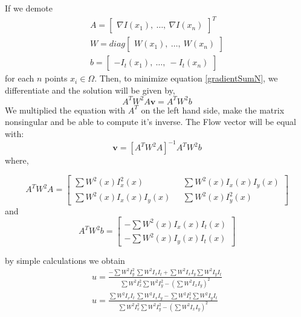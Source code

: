 \documentclass[12pt,a4paper,twoside]{report}
\begin{document}
{If we demote
\begin{equation}
\begin{split}
A = \begin{bmatrix}
\nabla I(x_1), \ \dots , \ \nabla I(x_n)
\end{bmatrix} ^T \\
W = diag
\begin{bmatrix}
W(x_1), \ \dots , \ W(x_n)
\end{bmatrix}
\\
b = 
\begin{bmatrix}
-I_t(x_1), \ \dots, \ -I_t(x_n) 
\end{bmatrix}
\end{split}
\end{equation}
for each $n$ points $x_i \in \Omega$. Then, to minimize equation \ref{gradientSumN}, we differentiate  and the solution will be given by,
\begin{equation}
	A^T W^2 A  \boldsymbol{v} = A^T W^2 b 
\end{equation}
We multiplied the equation with $A^T$ on the left hand side, make the matrix nonsingular and be able to compute it's inverse. The Flow vector will be equal with:
\begin{equation}
\boldsymbol{v} = [A^T W^2 A  ]^{-1}A^T W^2 b
\end{equation}
where,

\begin{equation}
A^T W^2 A = 
\begin{bmatrix}
\sum W^2(x)I_x^2(x) \ \ \  
&\sum W^2(x)I_x(x) I_y(x) \\
\sum W^2(x)I_x(x) I_y(x) \ \ \  
&\sum W^2(x)I_y^2(x) 
\end{bmatrix}
\end{equation}
and
\begin{equation}
A^T W^2 b = 
\begin{bmatrix}
-\sum W^2(x)I_x(x)I_t(x)   \\
-\sum W^2(x)I_y(x) I_t(x)  

\end{bmatrix}
\end{equation}
 
by simple calculations we obtain
\begin{equation}
\begin{split}
	u =\frac{-\sum W^2I_y^2\ \sum W^2I_xI_t 
		+ \sum W^2I_x I_y  \sum W^2I_yI_t }
	{\sum W^2 I_x^2 \sum W^2 I_y^2
		- (\sum W^2 I_x I_y)^2 } \\
	u =\frac{\sum W^2I_x I_t\ \sum W^2I_xI_y 
		 - \sum W^2I_x^2  \sum W^2I_yI_t }
	{\sum W^2 I_x^2 \sum W^2 I_y^2
		- (\sum W^2 I_x I_y)^2 } \\
\end{split}
\end{equation}

}
\end{document}
